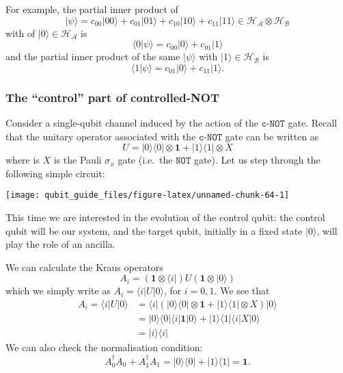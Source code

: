 \documentclass[fleqn]{article}
\begin{document}
For example, the partial inner product of
\[
  |\psi\rangle=c_{00}|00\rangle+c_{01}|01\rangle+c_{10}|10\rangle+c_{11}|11\rangle\in\mathcal{H}_{\mathcal{A}}\otimes\mathcal{H}_{\mathcal{B}}
\]
with of \(|0\rangle\in\mathcal{H}_{\mathcal{A}}\) is
\[
  \langle 0|\psi\rangle = c_{00}|0\rangle + c_{01}|1\rangle
\]
and the partial inner product of the same \(|\psi\rangle\) with \(|1\rangle\in\mathcal{H}_{\mathcal{B}}\) is
\[
  \langle 1|\psi\rangle = c_{01}|0\rangle + c_{11}|1\rangle.
\]

\hypertarget{control-controlled-NOT}{%
\subsubsection{The ``control'' part of controlled-NOT}\label{control-controlled-NOT}}

Consider a single-qubit channel induced by the action of the \(\texttt{c-NOT}\) gate.
Recall that the unitary operator associated with the \(\texttt{c-NOT}\) gate can be written as
\[
  U = |0\rangle\langle 0|\otimes\mathbf{1}+ |1\rangle\langle 1|\otimes X
\]
where is \(X\) is the Pauli \(\sigma_x\) gate (i.e.~the \(\texttt{NOT}\) gate).
Let us step through the following simple circuit:

\begin{center}\texttt{[image: qubit\_guide\_files/figure-latex/unnamed-chunk-64-1]} \end{center}

This time we are interested in the evolution of the control qubit: the control qubit will be our system, and the target qubit, initially in a fixed state \(|0\rangle\), will play the role of an ancilla.

We can calculate the Kraus operators
\[
  A_i = (\mathbf{1}\otimes\langle i|) U (\mathbf{1}\otimes|0\rangle)
\]
which we simply write as \(A_i=\langle i|U|0\rangle\), for \(i=0,1\).
We see that
\[
  \begin{aligned}
    A_i = \langle i|U|0\rangle
    &= \langle i| (|0\rangle\langle 0|\otimes\mathbf{1}+ |1\rangle\langle 1|\otimes X) |0\rangle
  \\&= |0\rangle\langle 0|\langle i|\mathbf{1}|0\rangle + |1\rangle\langle 1|\langle i|X|0\rangle
  \\&= |i\rangle\langle i|
\end{aligned}
\]
We can also check the normalisation condition:
\[
  A_0^\dagger A_0 + A_1^\dagger A_1
  = |0\rangle\langle 0| + |1\rangle\langle 1|
  =\mathbf{1}.
\]
\end{document}
